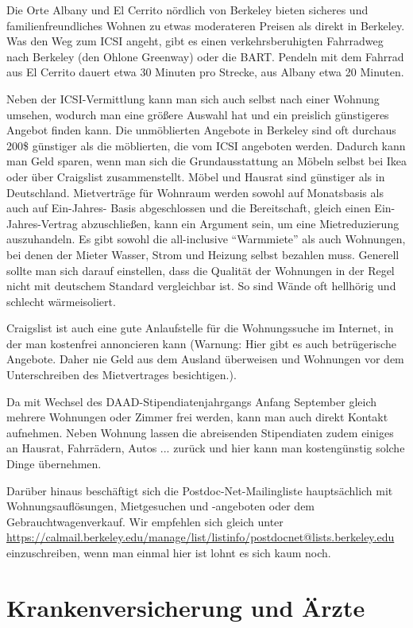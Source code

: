 \documentclass[a4paper]{scrreprt}
\begin{document}
Die Orte Albany und El Cerrito nördlich von Berkeley bieten sicheres und familienfreundliches Wohnen zu etwas moderateren Preisen als direkt in Berkeley. Was den Weg zum ICSI angeht, gibt es einen verkehrsberuhigten Fahrradweg nach Berkeley (den Ohlone Greenway) oder die BART. Pendeln mit dem Fahrrad aus El Cerrito dauert etwa 30 Minuten pro Strecke, aus Albany etwa 20 Minuten.

Neben der ICSI-Vermittlung kann man sich auch selbst nach einer Wohnung umsehen, wodurch man eine größere Auswahl hat und ein preislich günstigeres Angebot finden kann. Die unmöblierten Angebote in Berkeley sind oft durchaus 200\$ günstiger als die möblierten, die vom ICSI angeboten werden. Dadurch kann man Geld sparen, wenn man sich die Grundausstattung an Möbeln selbst bei Ikea oder über Craigslist zusammenstellt. Möbel und Hausrat sind günstiger als in Deutschland. Mietverträge für Wohnraum werden sowohl auf Monatsbasis als auch auf Ein-Jahres- Basis abgeschlossen und die Bereitschaft, gleich einen Ein-Jahres-Vertrag abzuschließen, kann ein Argument sein, um eine Mietreduzierung auszuhandeln. Es gibt sowohl die all-inclusive "`Warmmiete"' als auch Wohnungen, bei denen der Mieter Wasser, Strom und Heizung selbst bezahlen muss. Generell sollte man sich darauf einstellen, dass die Qualität der Wohnungen in der Regel nicht mit deutschem Standard vergleichbar ist. So sind Wände oft hellhörig und schlecht wärmeisoliert.

Craigslist ist auch eine gute Anlaufstelle für die Wohnungssuche im Internet, in der man kostenfrei annoncieren kann (Warnung: Hier gibt es auch betrügerische Angebote. Daher nie Geld aus dem Ausland überweisen und Wohnungen vor dem Unterschreiben des Mietvertrages besichtigen.).

Da mit Wechsel des DAAD-Stipendiatenjahrgangs Anfang September gleich mehrere Wohnungen oder Zimmer frei werden, kann man auch direkt Kontakt aufnehmen. Neben Wohnung lassen die abreisenden Stipendiaten zudem einiges an Hausrat, Fahrrädern, Autos ... zurück und hier kann man kostengünstig solche Dinge übernehmen.

Darüber hinaus beschäftigt sich die Postdoc-Net-Mailingliste hauptsächlich mit Wohnungsauflösungen, Mietgesuchen und -angeboten oder dem Gebrauchtwagenverkauf. Wir empfehlen sich gleich unter \url{https://calmail.berkeley.edu/manage/list/listinfo/postdocnet@lists.berkeley.edu}  einzuschreiben, wenn man einmal hier ist lohnt es sich kaum noch.


\section{Krankenversicherung und Ärzte}
\end{document}
